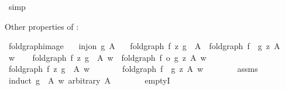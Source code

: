 \begin{isabellebody}
\isanewline
{}\isamarkupfalse%
\ simp%
\endisatagproof
{\isafoldproof}%
%
\isadelimproof
\isanewline
%
\endisadelimproof
\isanewline
\isanewline
{}\isamarkupfalse%
%
\begin{isamarkuptext}%
Other properties of :%
\end{isamarkuptext}\isamarkuptrue%
\isamarkupfalse%
\ fold{\isacharunderscore}{\kern0pt}graph{\isacharunderscore}{\kern0pt}image{\isacharcolon}{\kern0pt}\isanewline
\ \ \ {\isachardoublequoteopen}inj{\isacharunderscore}{\kern0pt}on\ g\ A{\isachardoublequoteclose}\isanewline
\ \ \ {\isachardoublequoteopen}fold{\isacharunderscore}{\kern0pt}graph\ f\ z\ {\isacharparenleft}{\kern0pt}g\ {\isacharbackquote}{\kern0pt}\ A{\isacharparenright}{\kern0pt}\ {\isacharequal}{\kern0pt}\ fold{\isacharunderscore}{\kern0pt}graph\ {\isacharparenleft}{\kern0pt}f\ {\isasymcirc}\ g{\isacharparenright}{\kern0pt}\ z\ A{\isachardoublequoteclose}\isanewline
%
\isadelimproof
%
\endisadelimproof
%
\isatagproof
{}\isamarkupfalse%
\isanewline
\ \ \isamarkupfalse%
\ w\isanewline
\ \ \isamarkupfalse%
\ {\isachardoublequoteopen}fold{\isacharunderscore}{\kern0pt}graph\ f\ z\ {\isacharparenleft}{\kern0pt}g\ {\isacharbackquote}{\kern0pt}\ A{\isacharparenright}{\kern0pt}\ w\ {\isacharequal}{\kern0pt}\ fold{\isacharunderscore}{\kern0pt}graph\ {\isacharparenleft}{\kern0pt}f\ o\ g{\isacharparenright}{\kern0pt}\ z\ A\ w{\isachardoublequoteclose}\isanewline
\ \ \isamarkupfalse%
\isanewline
\ \ \ \ \isamarkupfalse%
\ {\isachardoublequoteopen}fold{\isacharunderscore}{\kern0pt}graph\ f\ z\ {\isacharparenleft}{\kern0pt}g\ {\isacharbackquote}{\kern0pt}\ A{\isacharparenright}{\kern0pt}\ w{\isachardoublequoteclose}\isanewline
\ \ \ \ \isamarkupfalse%
\ \isamarkupfalse%
\ {\isachardoublequoteopen}fold{\isacharunderscore}{\kern0pt}graph\ {\isacharparenleft}{\kern0pt}f\ {\isasymcirc}\ g{\isacharparenright}{\kern0pt}\ z\ A\ w{\isachardoublequoteclose}\isanewline
\ \ \ \ \ \ \isamarkupfalse%
\ assms\isanewline
\ \ \ \ \isamarkupfalse%
\ {\isacharparenleft}{\kern0pt}induct\ {\isachardoublequoteopen}g\ {\isacharbackquote}{\kern0pt}\ A{\isachardoublequoteclose}\ w\ arbitrary{\isacharcolon}{\kern0pt}\ A{\isacharparenright}{\kern0pt}\isanewline
\ \ \ \ \ \ \isamarkupfalse%
\ emptyI\isanewline
\ \ \ \ \ \ \isamarkupfalse%
\ \isamarkupfalse%

\end{isabellebody}
